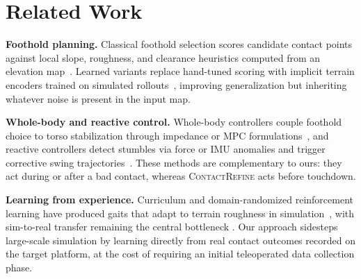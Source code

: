 \section{Related Work}
\textbf{Foothold planning.} Classical foothold selection scores candidate contact points
against local slope, roughness, and clearance heuristics computed from an elevation
map~\cite{singh2018survey}. Learned variants replace hand-tuned scoring with implicit terrain
encoders trained on simulated rollouts~\cite{mbeki2023legged}, improving generalization but
inheriting whatever noise is present in the input map.

\textbf{Whole-body and reactive control.} Whole-body controllers couple foothold choice to
torso stabilization through impedance or MPC formulations~\cite{nakashima2019whole,
delacroix2021mpc}, and reactive controllers detect stumbles via force or IMU anomalies and
trigger corrective swing trajectories~\cite{oduya2020reactive}. These methods are complementary
to ours: they act during or after a bad contact, whereas \textsc{ContactRefine} acts before
touchdown.

\textbf{Learning from experience.} Curriculum and domain-randomized reinforcement learning
have produced gaits that adapt to terrain roughness in simulation~\cite{papazian2022rl,
fontaine2021domain}, with sim-to-real transfer remaining the central bottleneck
\cite{halvorsen2022survey}. Our approach sidesteps large-scale simulation by learning directly
from real contact outcomes recorded on the target platform, at the cost of requiring an initial
teleoperated data collection phase.
